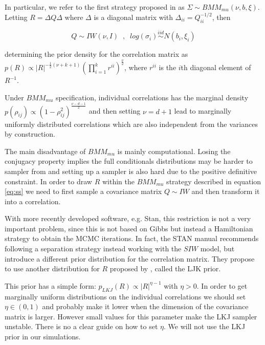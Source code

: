 \documentclass[a4paper]{article}
\begin{document}
In particular, we refer to the first strategy proposed in \cite{barnard2000} as $\Sigma \sim BMM_{mu}(\nu,b,\xi)$.  Letting $R = \Delta Q \Delta$ where $\Delta$ is a diagonal matrix with $\Delta_{ii} = Q_{ii}^{-1/2}$, then 

\begin{equation}
Q \sim IW(\nu, I ) \;\;, \;\;  log(\sigma_i) \stackrel{iid} \sim N(b_i, \xi_i)
\label{eq:ss}
\end{equation} 

determining the prior density for the correlation matrix as $p(R) \propto |R|^{-\frac{1}{2}(\nu+k+1) }  (\prod_{i=1}^k r^{ii}) ^{\frac{\nu}{2}}$, where $r^{ii}$ is the $i$th diagonal element of $R^{-1}$. 

Under $BMM_{mu}$ specification, individual correlations has the marginal density $p(\rho_{ij}) \propto (1-\rho_{ij}^2)^{\frac{\nu-d-1}{2}}$ and then setting $\nu=d+1$ lead to marginally uniformly distributed correlations which are also independent from the variances by construction. 

The main disadvantage of $BMM_{mu}$ is mainly computational. Losing the conjugacy property implies the full conditionals distributions may be harder to sampler from  and setting up a sampler is also hard due to the positive definitive constraint. In order to draw $R$ within the $BMM_{mu}$ strategy described in equation \eqref{eq:ss} we need to first sample a covariance matrix $Q \sim IW$ and then transform it  into a correlation. 

With more recently developed software, e.g. Stan, \citep{stan2014} this restriction is not a very important problem, since this is not based on Gibbs but instead a Hamiltonian strategy to obtain the MCMC iterations.  In fact, the STAN manual \citep{stanmanual2014} recommends following a separation strategy instead working with the $SIW$ model, but introduce a different prior distribution for the correlation matrix. They propose to use another distribution for $R$ proposed by \cite{lewandowski2009generating}, called the LJK prior.   

This prior has a simple form: $p_{LKJ}(R) \propto |R|^{\eta-1}$  with $\eta > 0$. In order to get marginally uniform distributions on the individual correlations we should  set $\eta \in (0,1)$ and probably make it lower when the dimension of the covariance matrix is larger. However small values for this parameter make the LKJ sampler unstable. There is no a clear guide on how to set $\eta$. We will not use the LKJ prior in our simulations.
\end{document}
